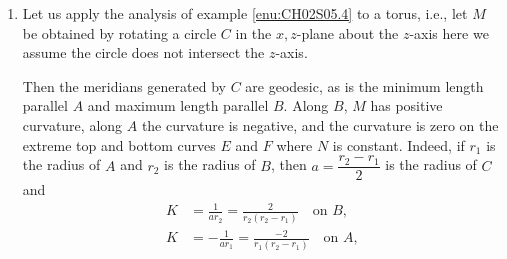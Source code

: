 \documentclass[../main]{subfiles}
\begin{document}
\begin{enumerate}
    Since the normal $N$ lines in $P$, the vector $\covariant_XN = L(X)$ lies in $P$ and is tangent to $M$ so $L(X) = kX$ and $X$ is a direction of curvature, where $X$ is the unit tangent to a meridian curve. From the remarks preceding the examples there is a direction of curvature orthogonal to $X$, so the unit vector $Y$ tangent to the parallel curves is a direction of curvature. The vector field $\covariant_XX$ is zero or orthogonal to $X$ and must lie in the plane $P$, hence $\covariant_XX = \pm\bar{k}_{1}N$, so $\connection_XX = 0$, and we see the meridians are geodesics. If the parallel curve through $m$ is a geodesic, then $\covariant_YY$ is normal to $M$ and not zero, since these curves are not geodesics in $\bR^3$. But $\covariant_YY$ is orthogonal to $e_3$, the $z$ direction, hence a parallel curve is a geodesic on $M$ iff the normal $N$ along the parallel curve is horizontal (i.e., orthogonal to the $z$-axis). If $m$ is a point on the $z$-axis, then every direction $X$ is tangent to a meridian and hence is a direction of curvature, so $m$ is umbilic and $K(m)\ge 0$.\label{enu:CH02S05.4}
    \item Let us apply the analysis of example \ref{enu:CH02S05.4} to a torus, i.e., let $M$ be obtained by rotating a circle $C$ in the $x, z$-plane about the $z$-axis here we assume the circle does not intersect the $z$-axis. 
    
    
    
    Then the meridians generated by $C$ are geodesic, as is the minimum length parallel $A$ and maximum length parallel $B$. Along $B$, $M$ has positive curvature, along $A$ the curvature is negative, and the curvature is zero on the extreme top and bottom curves $E$ and $F$ where $N$ is constant. Indeed, if $r_1$ is the radius of $A$ and $r_2$ is the radius of $B$, then $a = \dfrac{r_2-r_1}{2}$ is the radius of $C$ and 
    \[ 
    \begin{aligned}
        K &= \frac{1}{ar_2} = \frac{2}{r_2(r_2 - r_1)}\hspace{1em} \text{on } B, \\
        K &= -\frac{1}{ar_1} = \frac{-2}{r_1(r_2-r_1)}\hspace{1em} \text{on } A,
    \end{aligned} 
    \]
    

\end{enumerate}
\end{document}
